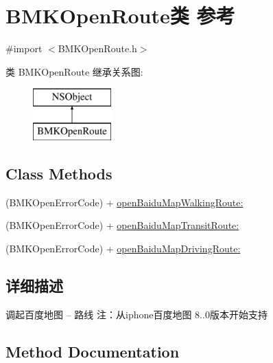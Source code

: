 \hypertarget{interface_b_m_k_open_route}{}\section{B\+M\+K\+Open\+Route类 参考}
\label{interface_b_m_k_open_route}


{\ttfamily \#import $<$B\+M\+K\+Open\+Route.\+h$>$}

类 B\+M\+K\+Open\+Route 继承关系图\+:\begin{figure}[H]
\begin{center}
\leavevmode
\includegraphics[height=2.000000cm]{interface_b_m_k_open_route}
\end{center}
\end{figure}
\subsection*{Class Methods}
\begin{DoxyCompactItemize}
\item 
(B\+M\+K\+Open\+Error\+Code) + \hyperlink{interface_b_m_k_open_route_a84f8e2bed0d6c42d2c9ab4de5de640c7}{open\+Baidu\+Map\+Walking\+Route\+:}
\item 
(B\+M\+K\+Open\+Error\+Code) + \hyperlink{interface_b_m_k_open_route_a85fba23fb552d31d38aba094f87a1c06}{open\+Baidu\+Map\+Transit\+Route\+:}
\item 
(B\+M\+K\+Open\+Error\+Code) + \hyperlink{interface_b_m_k_open_route_a57b8eccc1ab7f7fc73959aadbba525a4}{open\+Baidu\+Map\+Driving\+Route\+:}
\end{DoxyCompactItemize}


\subsection{详细描述}
调起百度地图 -- 路线 注：从iphone百度地图 8..\+0版本开始支持 

\subsection{Method Documentation}
\hypertarget{interface_b_m_k_open_route_a57b8eccc1ab7f7fc73959aadbba525a4}{}

